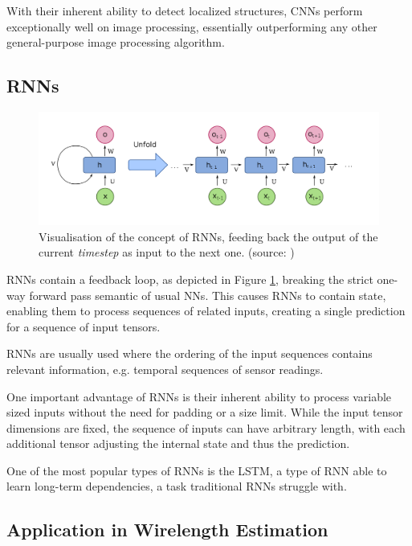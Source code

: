 With their inherent ability to detect localized structures, \glspl{CNN} perform exceptionally well on image processing, essentially outperforming any other general-purpose image processing algorithm.\cite{dl-vs-cv}\cite{cv-vs-dl}

\subsection{\glspl{RNN}}

\begin{figure}
	\includegraphics[width=\textwidth]{plots/recurrent-layer.png}
	\caption{Visualisation of the concept of \glspl{RNN}, feeding back the output of the current \textit{timestep} as input to the next one. (source: \cite{recurrent-layer-plot})}
	\label{fig:recurrent-layer}
\end{figure}

\glspl{RNN} contain a feedback loop, as depicted in Figure \ref{fig:recurrent-layer}, breaking the strict one-way forward pass semantic of usual \glspl{NN}. This causes \glspl{RNN} to contain state, enabling them to process sequences of related inputs, creating a single prediction for a sequence of input tensors.

\glspl{RNN} are usually used where the ordering of the input sequences contains relevant information, e.g. temporal sequences of sensor readings.

One important advantage of \glspl{RNN} is their inherent ability to process variable sized inputs without the need for padding or a size limit. While the input tensor dimensions are fixed, the sequence of inputs can have arbitrary length, with each additional tensor adjusting the internal state and thus the prediction.

One of the most popular types of \glspl{RNN} is the \gls{LSTM}\cite{lstm-paper}, a type of \gls{RNN} able to learn long-term dependencies, a task traditional \glspl{RNN} struggle with.\cite{lstm-web}

\subsection{Application in Wirelength Estimation}

